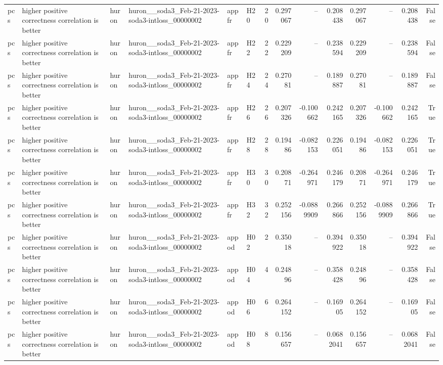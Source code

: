 \begin{longtable}{llllllrrrrrrrr}
pcs & higher positive correctness correlation is better & huron & huron\_\_soda3\_Feb-21-2023-soda3-intloss\_00000002 & appfr & H20 & 20 & 0.297067 & -- & 0.208438 & 0.297067 & -- & 0.208438 & False \\
pcs & higher positive correctness correlation is better & huron & huron\_\_soda3\_Feb-21-2023-soda3-intloss\_00000002 & appfr & H22 & 22 & 0.229209 & -- & 0.238594 & 0.229209 & -- & 0.238594 & False \\
pcs & higher positive correctness correlation is better & huron & huron\_\_soda3\_Feb-21-2023-soda3-intloss\_00000002 & appfr & H24 & 24 & 0.27081 & -- & 0.189887 & 0.27081 & -- & 0.189887 & False \\
pcs & higher positive correctness correlation is better & huron & huron\_\_soda3\_Feb-21-2023-soda3-intloss\_00000002 & appfr & H26 & 26 & 0.207326 & -0.100662 & 0.242165 & 0.207326 & -0.100662 & 0.242165 & True \\
pcs & higher positive correctness correlation is better & huron & huron\_\_soda3\_Feb-21-2023-soda3-intloss\_00000002 & appfr & H28 & 28 & 0.19486 & -0.082153 & 0.226051 & 0.19486 & -0.082153 & 0.226051 & True \\
pcs & higher positive correctness correlation is better & huron & huron\_\_soda3\_Feb-21-2023-soda3-intloss\_00000002 & appfr & H30 & 30 & 0.20871 & -0.264971 & 0.246179 & 0.20871 & -0.264971 & 0.246179 & True \\
pcs & higher positive correctness correlation is better & huron & huron\_\_soda3\_Feb-21-2023-soda3-intloss\_00000002 & appfr & H32 & 32 & 0.252156 & -0.0889909 & 0.266866 & 0.252156 & -0.0889909 & 0.266866 & True \\
pcs & higher positive correctness correlation is better & huron & huron\_\_soda3\_Feb-21-2023-soda3-intloss\_00000002 & appod & H02 & 2 & 0.35018 & -- & 0.394922 & 0.35018 & -- & 0.394922 & False \\
pcs & higher positive correctness correlation is better & huron & huron\_\_soda3\_Feb-21-2023-soda3-intloss\_00000002 & appod & H04 & 4 & 0.24896 & -- & 0.358428 & 0.24896 & -- & 0.358428 & False \\
pcs & higher positive correctness correlation is better & huron & huron\_\_soda3\_Feb-21-2023-soda3-intloss\_00000002 & appod & H06 & 6 & 0.264152 & -- & 0.16905 & 0.264152 & -- & 0.16905 & False \\
pcs & higher positive correctness correlation is better & huron & huron\_\_soda3\_Feb-21-2023-soda3-intloss\_00000002 & appod & H08 & 8 & 0.156657 & -- & 0.0682041 & 0.156657 & -- & 0.0682041 & False \\

\end{longtable}
